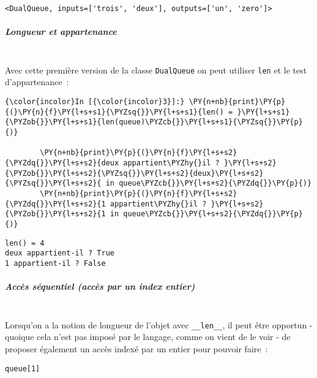     \begin{Verbatim}[commandchars=\\\{\}]
<DualQueue, inputs=['trois', 'deux'], outputs=['un', 'zero']>

    \end{Verbatim}

    \hypertarget{longueur-et-appartenance}{%
\subparagraph{Longueur et appartenance\\\\}\label{longueur-et-appartenance}}

    Avec cette première version de la classe \texttt{DualQueue} on peut
utiliser \texttt{len} et le test d'appartenance~:

    \begin{Verbatim}[commandchars=\\\{\}]
{\color{incolor}In [{\color{incolor}3}]:} \PY{n+nb}{print}\PY{p}{(}\PY{n}{f}\PY{l+s+s1}{\PYZsq{}}\PY{l+s+s1}{len() = }\PY{l+s+s1}{\PYZob{}}\PY{l+s+s1}{len(queue)\PYZcb{}}\PY{l+s+s1}{\PYZsq{}}\PY{p}{)}
        
        \PY{n+nb}{print}\PY{p}{(}\PY{n}{f}\PY{l+s+s2}{\PYZdq{}}\PY{l+s+s2}{deux appartient\PYZhy{}il ? }\PY{l+s+s2}{\PYZob{}}\PY{l+s+s2}{\PYZsq{}}\PY{l+s+s2}{deux}\PY{l+s+s2}{\PYZsq{}}\PY{l+s+s2}{ in queue\PYZcb{}}\PY{l+s+s2}{\PYZdq{}}\PY{p}{)}
        \PY{n+nb}{print}\PY{p}{(}\PY{n}{f}\PY{l+s+s2}{\PYZdq{}}\PY{l+s+s2}{1 appartient\PYZhy{}il ? }\PY{l+s+s2}{\PYZob{}}\PY{l+s+s2}{1 in queue\PYZcb{}}\PY{l+s+s2}{\PYZdq{}}\PY{p}{)}
\end{Verbatim}


    \begin{Verbatim}[commandchars=\\\{\}]
len() = 4
deux appartient-il ? True
1 appartient-il ? False

    \end{Verbatim}

    \hypertarget{accuxe8s-suxe9quentiel-accuxe8s-par-un-index-entier}{%
\subparagraph{Accès séquentiel (accès par un index
entier)\\\\}\label{accuxe8s-suxe9quentiel-accuxe8s-par-un-index-entier}}

    Lorsqu'on a la notion de longueur de l'objet avec \texttt{\_\_len\_\_},
il peut être opportun - quoique cela n'est pas imposé par le langage,
comme on vient de le voir - de proposer également un accès indexé par un
entier pour pouvoir faire~:

\begin{verbatim}
queue[1]
\end{verbatim}


